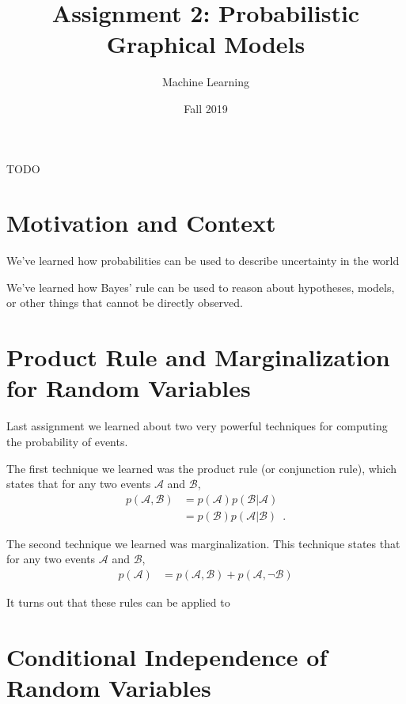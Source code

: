 \documentclass[assignment02_Solutions]{subfiles}
\title{Assignment 2: Probabilistic Graphical Models}
\author{Machine Learning}
\date{Fall 2019}
\begin{document}
\maketitle
\thispagestyle{firstpage}


\begin{learningobjectives}
\bi
\item TODO
\ei
\end{learningobjectives}

\section{Motivation and Context}
\bi
\item We’ve learned how probabilities can be used to describe uncertainty in the world
\item We’ve learned how Bayes' rule can be used to reason about hypotheses, models, or other things that cannot be directly observed.
\ei

\section{Product Rule and Marginalization for Random Variables}
\begin{recall}
Last assignment we learned about two very powerful techniques for computing the probability of events.
\bi
\item The first technique we learned was the product rule (or conjunction rule), which states that for any two events $\mathcal{A}$ and $\mathcal{B}$,
\begin{align}
p(\mathcal{A}, \mathcal{B}) &= p(\mathcal{A}) p(\mathcal{B}|\mathcal{A}) \\
&= p(\mathcal{B}) p(\mathcal{A}|\mathcal{B}) \enspace  . \nonumber
\end{align}
\item The second technique we learned was marginalization.  This technique states that for any two events $\mathcal{A}$ and $\mathcal{B}$,
\begin{align}
p(\mathcal{A}) &= p(\mathcal{A}, \mathcal{B}) + p(\mathcal{A}, \neg \mathcal{B})
\end{align}
\ei
\end{recall}

It turns out that these rules can be applied to 

\section{Conditional Independence of Random Variables}
\end{document}
